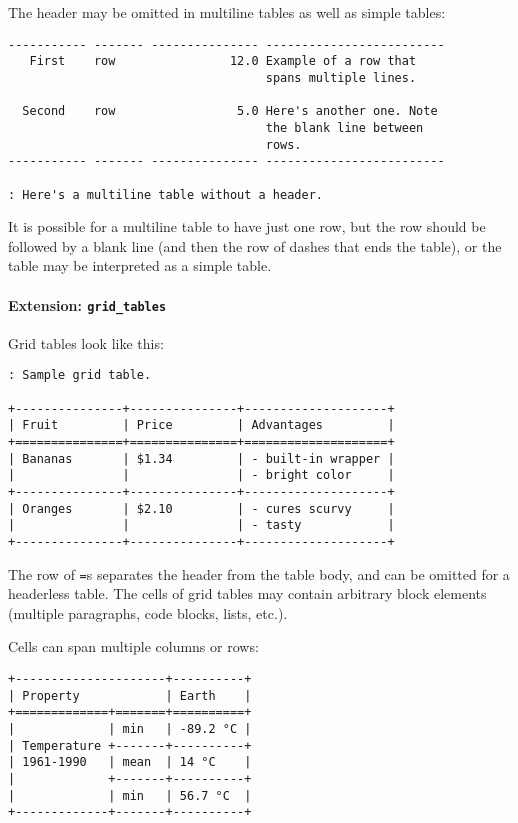 The header may be omitted in multiline tables as well as simple tables:

\begin{verbatim}
----------- ------- --------------- -------------------------
   First    row                12.0 Example of a row that
                                    spans multiple lines.

  Second    row                 5.0 Here's another one. Note
                                    the blank line between
                                    rows.
----------- ------- --------------- -------------------------

: Here's a multiline table without a header.
\end{verbatim}

It is possible for a multiline table to have just one row, but the row
should be followed by a blank line (and then the row of dashes that ends
the table), or the table may be interpreted as a simple table.

\hypertarget{extension-grid_tables}{%
\paragraph{\texorpdfstring{Extension:
\texttt{grid\_tables}}{Extension: grid\_tables}}\label{extension-grid_tables}}

Grid tables look like this:

\begin{verbatim}
: Sample grid table.

+---------------+---------------+--------------------+
| Fruit         | Price         | Advantages         |
+===============+===============+====================+
| Bananas       | $1.34         | - built-in wrapper |
|               |               | - bright color     |
+---------------+---------------+--------------------+
| Oranges       | $2.10         | - cures scurvy     |
|               |               | - tasty            |
+---------------+---------------+--------------------+
\end{verbatim}

The row of \texttt{=}s separates the header from the table body, and can
be omitted for a headerless table. The cells of grid tables may contain
arbitrary block elements (multiple paragraphs, code blocks, lists,
etc.).

Cells can span multiple columns or rows:

\begin{verbatim}
+---------------------+----------+
| Property            | Earth    |
+=============+=======+==========+
|             | min   | -89.2 °C |
| Temperature +-------+----------+
| 1961-1990   | mean  | 14 °C    |
|             +-------+----------+
|             | min   | 56.7 °C  |
+-------------+-------+----------+
\end{verbatim}

